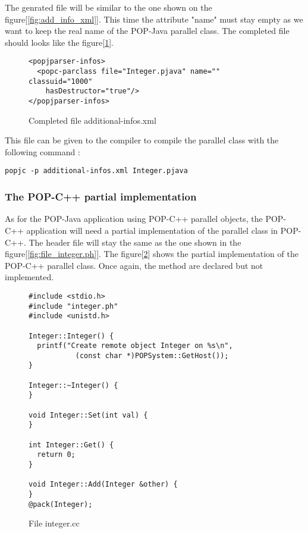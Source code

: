 The genrated file will be similar to the one shown on the figure[\ref{fig:add_info_xml}]. This time the attribute "name" must stay empty as we want to keep the real name of the POP-Java parallel class. The completed file should looks like the figure[\ref{fig:complete_add_info_xml2}].

\begin{figure}[ht]
	\caption{Completed file additional-infos.xml}
	\label{fig:complete_add_info_xml2}
\begin{lstlisting}
<popjparser-infos>
  <popc-parclass file="Integer.pjava" name="" classuid="1000" 
    hasDestructor="true"/>
</popjparser-infos>
\end{lstlisting}
\end{figure}

This file can be given to the compiler to compile the parallel class with the following command : 
\begin{lstlisting}
popjc -p additional-infos.xml Integer.pjava
\end{lstlisting}

\pagebreak
\subsubsection{The POP-C++ partial implementation}
As for the POP-Java application using POP-C++ parallel objects, the POP-C++ application will need a partial implementation of the parallel class in POP-C++. The header file will stay the same as the one shown in the figure[\ref{fig:file_integer.ph}]. The figure[\ref{fig:file_integer2.cc}] shows the partial implementation of the POP-C++ parallel class. Once again, the method are declared but not implemented. 

\begin{figure}[ht]
	\caption{File integer.cc}
	\label{fig:file_integer2.cc}
\begin{lstlisting}
#include <stdio.h>
#include "integer.ph"
#include <unistd.h>

Integer::Integer() {
  printf("Create remote object Integer on %s\n",
		   (const char *)POPSystem::GetHost());
}

Integer::~Integer() {
}

void Integer::Set(int val) {
}

int Integer::Get() {
  return 0;
}

void Integer::Add(Integer &other) {
}
@pack(Integer);
\end{lstlisting}
\end{figure}

